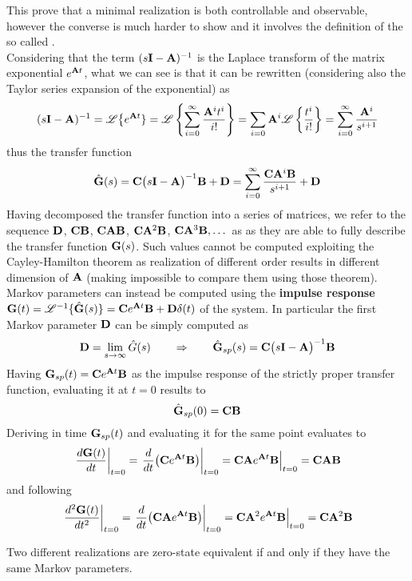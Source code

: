 	This prove that a minimal realization is both controllable and observable, however the converse is much harder to show and it involves the definition of the so called .\\
	Considering that the term $(s\mathbf{I}-\mathbf{A})^{-1}$ is the Laplace transform of the matrix exponential $e^{\mathbf{A} t}$, what we can see is that it can be rewritten (considering also the Taylor series expansion of the exponential) as
	\[ (s\mathbf{I}-\mathbf{A})^{-1} = \mathscr L\big\{ e^{\mathbf{A} t} \} = \mathscr L \left\{ \sum_{i=0}^{\infty} \frac{\mathbf{A}^i t^i}{i!} \right\} = \sum_{i=0} \mathbf{A}^i \mathscr L \left\{ \frac{t^i}{i!} \right\} = \sum_{i=0}^\infty \frac{\mathbf{A}^i}{s^{i+1}} \]
	thus the transfer function
	\begin{equation}
		\hat {\mathbf{G}}(s) = \mathbf{C}\big( s\mathbf{I}-\mathbf{A}\big)^{-1} \mathbf{B} + \mathbf{D} = \sum_{i=0}^\infty \frac{\mathbf{C}\mathbf{A}^i\mathbf{B}}{s^{i+1}} + \mathbf{D} 
	\end{equation}
	Having decomposed the transfer function into a series of matrices, we refer to the sequence $\mathbf{D}$, $\mathbf{C}\mathbf{B}$, $\mathbf{C}\mathbf{A}\mathbf{B}$, $\mathbf{C}\mathbf{A}^2\mathbf{B}$, $\mathbf{C}\mathbf{A}^3\mathbf{B}, \dots$ as  as they are able to fully describe the transfer function $\mathbf{G}(s)$. Such values cannot be computed exploiting the Cayley-Hamilton theorem as realization of different order results in different dimension of $\mathbf{A}$ (making impossible to compare them using those theorem). Markov parameters can instead be computed using the \textbf{impulse response} $\mathbf{G}(t) = \mathscr L^{-1}\{\hat {\mathbf{G}}(s)\} = \mathbf{C} e^{\mathbf{A} t}\mathbf{B} + \mathbf{D} \delta(t)$  of the system. In particular the first Markov parameter $\mathbf{D}$ can be simply computed as
	\[ \mathbf{D} = \lim_{s\rightarrow \infty} \hat G(s) \qquad \Rightarrow \qquad \hat {\mathbf{G}}_{sp}(s) = \mathbf{C}\big(s\mathbf{I}-\mathbf{A}\big)^{-1}\mathbf{B}  \]
	Having $\mathbf{G}_{sp}(t) = \mathbf{C} e^{\mathbf{A} t}\mathbf{B}$ as the impulse response of the strictly proper transfer function, evaluating it at $t = 0$ results to
	\[ \hat {\mathbf{G}}_{sp}(0) = \mathbf{C}\mathbf{B}  \]
	Deriving in time $\mathbf{G}_{sp}(t)$ and evaluating it for the same point evaluates to
	\[ \left. \frac{d \mathbf{G}(t)}{dt} \right|_{t=0} = \left. \frac{d}{dt} \big(\mathbf{C} e^{\mathbf{A} t} \mathbf{B}\big) \right|_{t=0} = \mathbf{C}\mathbf{A} e^{\mathbf{A} t} \mathbf{B} \Big|_{t=0} = \mathbf{C}\mathbf{A}\mathbf{B}  \]
	and following
	\[ \left. \frac{d^2 \mathbf{G}(t)}{dt^2} \right|_{t=0} = \left. \frac{d}{dt} \big(\mathbf{C} \mathbf{A} e^{\mathbf{A} t} \mathbf{B}\big) \right|_{t=0} = \mathbf{C}\mathbf{A}^2 e^{\mathbf{A} t} \mathbf{B} \Big|_{t=0} = \mathbf{C}\mathbf{A}^2\mathbf{B}  \]
	
	\begin{theorem} \label{th:kal:temp4}
		Two different realizations are zero-state equivalent if and  only if they have the same Markov parameters.
	\end{theorem}
	
